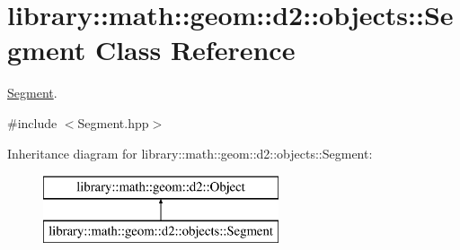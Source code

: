 \hypertarget{classlibrary_1_1math_1_1geom_1_1d2_1_1objects_1_1_segment}{}\section{library\+:\+:math\+:\+:geom\+:\+:d2\+:\+:objects\+:\+:Segment Class Reference}
\label{classlibrary_1_1math_1_1geom_1_1d2_1_1objects_1_1_segment}


\hyperlink{classlibrary_1_1math_1_1geom_1_1d2_1_1objects_1_1_segment}{Segment}.  




{\ttfamily \#include $<$Segment.\+hpp$>$}

Inheritance diagram for library\+:\+:math\+:\+:geom\+:\+:d2\+:\+:objects\+:\+:Segment\+:\begin{figure}[H]
\begin{center}
\leavevmode
\includegraphics[height=2.000000cm]{classlibrary_1_1math_1_1geom_1_1d2_1_1objects_1_1_segment}
\end{center}
\end{figure}
